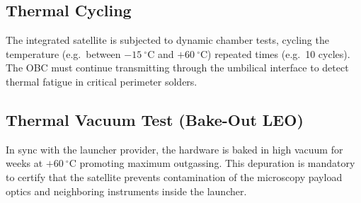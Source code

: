 \subsection{Thermal Cycling}
The integrated satellite is subjected to dynamic chamber tests, cycling the temperature (e.g.\ between $-15\ ^\circ$C and $+60\ ^\circ$C) repeated times (e.g.\ 10 cycles). The OBC must continue transmitting through the umbilical interface to detect thermal fatigue in critical perimeter solders.

\subsection{Thermal Vacuum Test (Bake-Out LEO)}
In sync with the launcher provider, the hardware is baked in high vacuum for weeks at $+60\ ^\circ$C promoting maximum outgassing. This depuration is mandatory to certify that the satellite prevents contamination of the microscopy payload optics and neighboring instruments inside the launcher.
